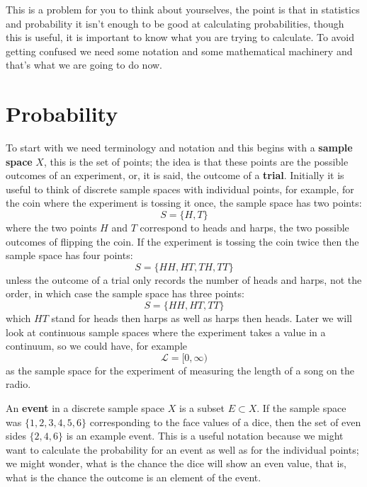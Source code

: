 \documentclass[11pt,a4paper]{scrartcl}
\begin{document}
This is a problem for you to think about yourselves, the point is that
in statistics and probability it isn't enough to be good at
calculating probabilities, though this is useful, it is important to
know what you are trying to calculate. To avoid getting confused we
need some notation and some mathematical machinery and that's what we
are going to do now.

\section*{Probability}

To start with we need terminology and notation and this begins with
a \textbf{sample space} $X$, this is the set of points; the idea is
that these points are the possible outcomes of an experiment, or, it
is said, the outcome of a \textbf{trial}. Initially it is useful to
think of discrete sample spaces with individual points, for example,
for the coin where the experiment is tossing it once, the sample space
has two points:
\begin{equation}
S=\{H,T\}
\end{equation}
where the two points $H$ and $T$ correspond to heads and harps, the
two possible outcomes of flipping the coin. If the experiment is
tossing the coin twice then the sample space has four points:
\begin{equation}
S=\{HH,HT,TH,TT\}
\end{equation}
unless the outcome of a trial only records the number of heads and
harps, not the order, in which case the sample space has three points:
\begin{equation}
S=\{HH,HT,TT\}
\end{equation}
which $HT$ stand for heads then harps as well as harps then
heads. Later we will look at continuous sample spaces where the
experiment takes a value in a continuum, so we could have, for example
\begin{equation}
\mathcal{L}=[0,\infty)
\end{equation}
as the sample space for the experiment of measuring the length of a
song on the radio.

An \textbf{event} in a discrete sample space $X$ is a subset
$E\subset X$. If the sample space was $\{1,2,3,4,5,6\}$ corresponding to the
face values of a dice, then the set of even sides $\{2,4,6\}$ is an
example event. This is a useful notation because we might want to
calculate the probability for an event as well as for the individual
points; we might wonder, what is the chance the dice will show an even
value, that is, what is the chance the outcome is an element of the
event.
\end{document}

